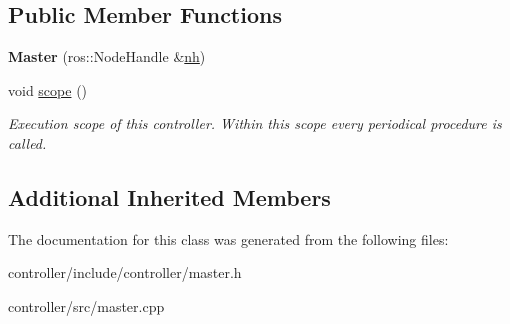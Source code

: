 \subsection*{Public Member Functions}
\begin{DoxyCompactItemize}
\item 
{\bfseries Master} (ros\+::\+Node\+Handle \&\hyperlink{classController_a24e3d3c2536f6ed29018bad1fd53dae2}{nh})\hypertarget{classMaster_ab52840de45f9ce7022c9cf58cfb49398}{}\label{classMaster_ab52840de45f9ce7022c9cf58cfb49398}

\item 
void \hyperlink{classMaster_a159c65ac1a0c005bbcd1868b972935ce}{scope} ()\hypertarget{classMaster_a159c65ac1a0c005bbcd1868b972935ce}{}\label{classMaster_a159c65ac1a0c005bbcd1868b972935ce}

\begin{DoxyCompactList}\small\item\em Execution scope of this controller. Within this scope every periodical procedure is called. \end{DoxyCompactList}\end{DoxyCompactItemize}
\subsection*{Additional Inherited Members}


The documentation for this class was generated from the following files\+:\begin{DoxyCompactItemize}
\item 
controller/include/controller/master.\+h\item 
controller/src/master.\+cpp\end{DoxyCompactItemize}
